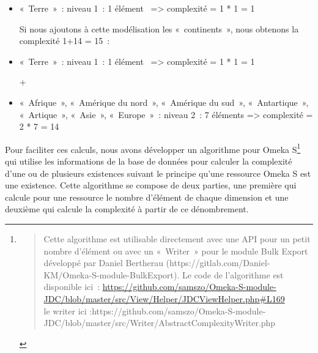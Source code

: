 \documentclass[
  letterpaper,
  DIV=11,
  numbers=noendperiod]{scrreprt}
\begin{document}
\begin{itemize}
\item
  «~Terre~»~: niveau 1~: 1 élément~ =\textgreater{} complexité = 1 * 1 =
  1

  Si nous ajoutons à cette modélisation les «~continents~», nous
  obtenons la complexité 1+14 = 15~:
\item
  «~Terre~»~: niveau 1~: 1 élément~ =\textgreater{} complexité = 1 * 1 =
  1

  +
\item
  «~Afrique~», «~Amérique du nord~», «~Amérique du sud~»,
  «~Antartique~», «~Artique~», «~Asie~», «~Europe~»~: niveau 2~: 7
  éléments =\textgreater{} complexité = 2 * 7 = 14
\end{itemize}

Pour faciliter ces calculs, nous avons développer un algorithme pour
Omeka S\footnote{\begin{quote}
  Cette algorithme est utilisable directement avec une API pour un petit
  nombre d'élément ou avec un «~Writer~» pour le module Bulk Export
  développé par Daniel Bertherau
  (https://gitlab.com/Daniel-KM/Omeka-S-module-BulkExport). Le code de
  l'algorithme est disponible ici~:
  \url{https://github.com/samszo/Omeka-S-module-JDC/blob/master/src/View/Helper/JDCViewHelper.php\#L169}\\
  le writer ici
  :https://github.com/samszo/Omeka-S-module-JDC/blob/master/src/Writer/AbstractComplexityWriter.php
  \end{quote}} qui utilise les informations de la base de données pour
calculer la complexité d'une ou de plusieurs existences suivant le
principe qu'une ressource Omeka S est une existence. Cette algorithme se
compose de deux parties, une première qui calcule pour une ressource le
nombre d'élément de chaque dimension et une deuxième qui calcule la
complexité à partir de ce dénombrement.
\end{document}
